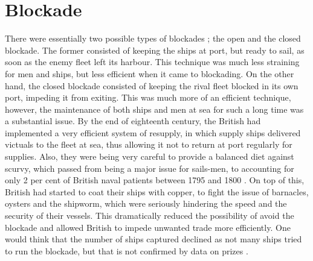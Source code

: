 \documentclass[12pt,a4paper,notitlepage,english]{article}
\begin{document}
%
%
%
%

\section{Blockade}\label{app:appendix_blockade}
There were essentially two possible types of blockades \citep{Corbett2004}; the open and the closed blockade. The former consisted of keeping the ships at port, but ready to sail, as soon as the enemy fleet left its harbour. This technique was much less straining for men and ships, but less efficient when it came to blockading. On the other hand, the closed blockade consisted of keeping the rival fleet blocked in its own port, impeding it from exiting. This was much more of an efficient technique, however, the maintenance of both ships and men at sea for such a long time was a substantial issue.
By the end of eighteenth century, the British had implemented a very efficient system of resupply, in which supply ships delivered victuals to the fleet at sea, thus allowing it not to return at port regularly for supplies. 
Also, they were being very careful to provide a balanced diet against scurvy, which passed from being a major issue for sails-men, to accounting for only 2 per cent of British naval patients between 1795 and 1800 \citep{Rodger2005}. On top of this, British had started to coat their ships with copper, to fight the issue of barnacles, oysters and the shipworm, which were seriously hindering the speed and the security of their vessels. This dramatically reduced the possibility of avoid the blockade and allowed British to impede unwanted trade more efficiently.
One would think that the number of ships captured declined as not many ships tried to run the blockade, but that is not confirmed by data on prizes \cite{Benjamin2009}.
\end{document}
